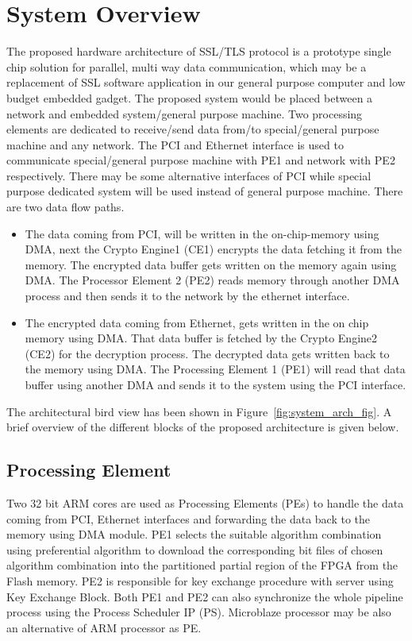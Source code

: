 \documentclass[3p,times]{elsarticle}
\begin{document}
\section{System Overview}
The proposed hardware architecture of SSL/TLS protocol is a prototype single chip solution for parallel, multi way data communication, which may be a replacement of SSL software application in our general purpose computer and low budget embedded gadget. The proposed system would be placed between a network and embedded system/general purpose machine. Two processing elements are dedicated to receive/send data from/to special/general purpose machine and any network. The PCI and Ethernet interface is used to communicate special/general purpose machine with PE1 and network with PE2 respectively. There may be some alternative interfaces of PCI while special purpose dedicated system will be used  instead of general purpose machine. There are two data flow paths.
\begin{itemize}
\item The data coming from PCI, will be written in the on-chip-memory using DMA, next the Crypto Engine1 (CE1) encrypts the data fetching it from the memory. The encrypted data buffer gets written on the memory again using DMA. The Processor Element 2 (PE2) reads memory through another DMA process and then sends it to the network by the ethernet interface.
\item The encrypted data coming from Ethernet, gets written in the on chip memory using DMA. That data buffer is fetched by the Crypto Engine2 (CE2) for the decryption process. The decrypted data gets written back to the memory using DMA. The Processing Element 1 (PE1) will read that data buffer using another DMA and sends it to the system using the PCI interface.
\end{itemize} 
The architectural bird view has been shown in Figure~\ref{fig:system_arch_fig}.
A brief overview of the different blocks of the proposed architecture is given below.
\subsection{Processing Element}
Two 32 bit ARM cores are used as Processing Elements (PEs) to handle the data coming from PCI, Ethernet interfaces and forwarding the data back to the memory using DMA module. PE1 selects the suitable algorithm combination using preferential algorithm to download the corresponding bit files of chosen algorithm combination into the partitioned partial region of the FPGA from the Flash memory. PE2  is responsible for key exchange procedure with server using Key Exchange Block. Both PE1 and PE2 can also synchronize the whole pipeline process using the Process  Scheduler IP (PS). Microblaze processor may be also an alternative of ARM processor as PE.
\end{document}
